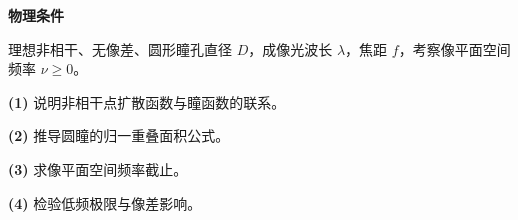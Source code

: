 \textbf{物理条件}\par 理想非相干、无像差、圆形瞳孔直径 \(D\)，成像光波长 \(\lambda\)，焦距 \(f\)，考察像平面空间频率 \(\nu\ge0\)。
\par\noindent\textbf{(1)} 说明非相干点扩散函数与瞳函数的联系。
\par\noindent\textbf{(2)} 推导圆瞳的归一重叠面积公式。
\par\noindent\textbf{(3)} 求像平面空间频率截止。
\par\noindent\textbf{(4)} 检验低频极限与像差影响。
